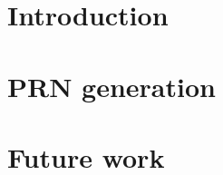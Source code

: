 \documentclass{tfg_domingo}
\begin{document}

\portada
\frontmatter
\gracias{}
\resumen{}{}
\tableofcontents

\mainmatter


\chapter{Introduction}



\chapter{PRN generation}











\chapter{Future work}
\end{document}
